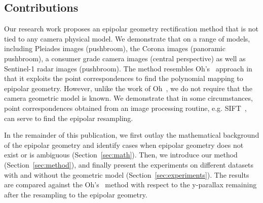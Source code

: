 \documentclass{ipol}
\begin{document}
 


 


\subsection{Contributions}
Our research work proposes an epipolar geometry rectification method that is not tied to any camera physical model. %
We demonstrate that on a range of models, including Pleiades images (pushbroom), the Corona images (panoramic pushbroom), a consumer grade camera images (central perspective) as well as Sentinel-1 radar images (pushbroom).
The method resembles Oh's~\cite{Oh2011} approach in that it exploits the point correspondences to find the polynomial mapping to epipolar geometry. However, unlike the work of Oh~\cite{Oh2011}, we do not require that the camera geometric model is known. We demonstrate that in some circumstances, point correspondences obtained from an image processing routine, e.g. SIFT~\cite{lowe2004distinctive}, can serve to find the epipolar resampling. 

In the remainder of this publication, we first outlay the mathematical background of the epipolar geometry and identify cases when epipolar geometry does not exist or is ambiguous  (Section~\ref{sec:math}). Then, we introduce our method (Section~\ref{sec:method}), and finally present the experiments on different datasets with and without the geometric model (Section~\ref{sec:experiments}). The results are compared against the Oh's~\cite{Oh2011} method with respect to the y-parallax remaining after the resampling to the epipolar geometry.

\end{document}
